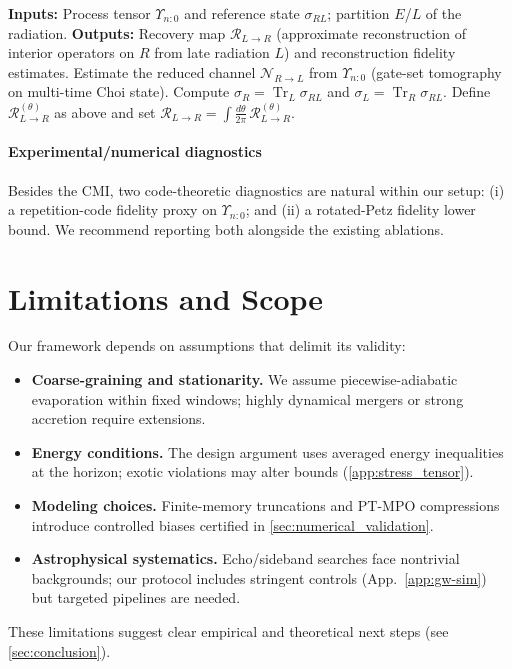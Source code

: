\documentclass[a4paper,11pt]{article}
\newcommand{\HMC}{\textsc{HMC}\xspace}
\newcommand{\Tr}{\operatorname{Tr}}
\theoremstyle{plain}
\theoremstyle{definition}
\theoremstyle{remark}
\begin{document}
\begin{algorithm}[htbp]
\caption{QEC reconstruction for \HMC{} via rotated Petz.}
\label{alg:rotated_petz_hmc}
\begin{algorithmic}[1]
\State \textbf{Inputs:} Process tensor $\Upsilon_{n{:}0}$ and reference state $\sigma_{RL}$; partition $E$/$L$ of the radiation.
\State \textbf{Outputs:} Recovery map $\mathcal{R}_{L\to R}$ (approximate reconstruction of interior operators on $R$ from late radiation $L$) and reconstruction fidelity estimates.
\State Estimate the reduced channel $\mathcal{N}_{R\to L}$ from $\Upsilon_{n{:}0}$ (gate-set tomography on multi-time Choi state).
\State Compute $\sigma_R=\Tr_L\sigma_{RL}$ and $\sigma_L=\Tr_R\sigma_{RL}$.
\State Define $\mathcal{R}^{(\theta)}_{L\to R}$ as above and set $\mathcal{R}_{L\to R} = \int \frac{d\theta}{2\pi}\,\mathcal{R}^{(\theta)}_{L\to R}$.
\end{algorithmic}
\end{algorithm}

\paragraph{Experimental/numerical diagnostics}
Besides the CMI, two code-theoretic diagnostics are natural within our setup: (i) a repetition-code fidelity proxy on $\Upsilon_{n{:}0}$; and (ii) a rotated-Petz fidelity lower bound. We recommend reporting both alongside the existing ablations.


\section{Limitations and Scope}
\label{sec:limitations}
Our framework depends on assumptions that delimit its validity:
\begin{itemize}[leftmargin=*]
\item \textbf{Coarse-graining and stationarity.} We assume piecewise-adiabatic evaporation within fixed windows; highly dynamical mergers or strong accretion require extensions.
\item \textbf{Energy conditions.} The design argument uses averaged energy inequalities at the horizon; exotic violations may alter bounds (\cref{app:stress_tensor}).
\item \textbf{Modeling choices.} Finite-memory truncations and PT-MPO compressions introduce controlled biases certified in \cref{sec:numerical_validation}.
\item \textbf{Astrophysical systematics.} Echo/sideband searches face nontrivial backgrounds; our protocol includes stringent controls (App.~\ref{app:gw-sim}) but targeted pipelines are needed.
\end{itemize}
These limitations suggest clear empirical and theoretical next steps (see \cref{sec:conclusion}).
\end{document}
